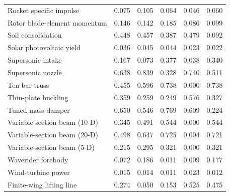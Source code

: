 \begin{table}[htbp]
\begin{tabular}{@{}lccccc@{}}
Rocket specific impulse & 0.075 & 0.105 & 0.064 & 0.046 & 0.060 \\
Rotor blade-element momentum & 0.146 & 0.142 & 0.185 & 0.086 & 0.099 \\
Soil consolidation & 0.448 & 0.457 & 0.387 & 0.479 & 0.092 \\
Solar photovoltaic yield & 0.036 & 0.045 & 0.044 & 0.023 & 0.022 \\
Supersonic intake & 0.167 & 0.073 & 0.377 & 0.038 & 0.340 \\
Supersonic nozzle & 0.638 & 0.839 & 0.328 & 0.740 & 0.511 \\
Ten-bar truss & 0.455 & 0.596 & 0.738 & 0.000 & 0.738 \\
Thin-plate buckling & 0.359 & 0.259 & 0.249 & 0.576 & 0.327 \\
Tuned mass damper & 0.650 & 0.546 & 0.769 & 0.609 & 0.224 \\
Variable-section beam (10-D) & 0.345 & 0.491 & 0.544 & 0.000 & 0.544 \\
Variable-section beam (20-D) & 0.498 & 0.647 & 0.725 & 0.004 & 0.721 \\
Variable-section beam (5-D) & 0.215 & 0.295 & 0.321 & 0.000 & 0.321 \\
Waverider forebody & 0.072 & 0.186 & 0.011 & 0.009 & 0.177 \\
Wind-turbine power & 0.015 & 0.014 & 0.011 & 0.023 & 0.012 \\
Finite-wing lifting line & 0.274 & 0.050 & 0.153 & 0.525 & 0.475 \\
\bottomrule
\end{tabular}
\end{table}
